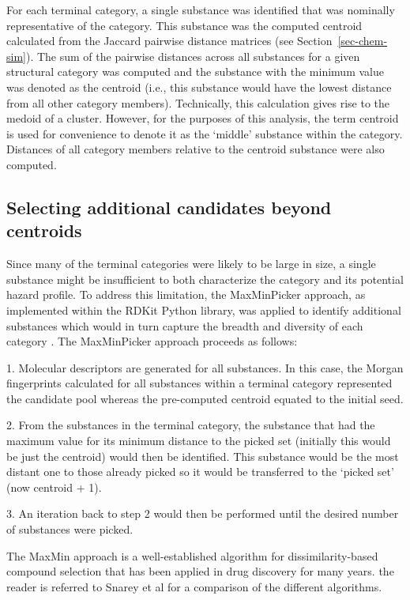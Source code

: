 \documentclass[
  super,
  preprint,
  3p]{elsarticle}
\begin{document}
For each terminal category, a single substance was identified that was
nominally representative of the category. This substance was the
computed centroid calculated from the Jaccard pairwise distance matrices
(see Section~\ref{sec-chem-sim}). The sum of the pairwise distances
across all substances for a given structural category was computed and
the substance with the minimum value was denoted as the centroid (i.e.,
this substance would have the lowest distance from all other category
members). Technically, this calculation gives rise to the medoid of a
cluster. However, for the purposes of this analysis, the term centroid
is used for convenience to denote it as the `middle' substance within
the category. Distances of all category members relative to the centroid
substance were also computed.

\hypertarget{sec-maxmin}{%
\subsection{Selecting additional candidates beyond
centroids}\label{sec-maxmin}}

Since many of the terminal categories were likely to be large in size, a
single substance might be insufficient to both characterize the category
and its potential hazard profile. To address this limitation, the
MaxMinPicker approach, as implemented within the RDKit Python library,
was applied to identify additional substances which would in turn
capture the breadth and diversity of each category
\citep{ashton_identification_2002}. The MaxMinPicker approach proceeds
as follows:

1. Molecular descriptors are generated for all substances. In this case,
the Morgan fingerprints calculated for all substances within a terminal
category represented the candidate pool whereas the pre-computed
centroid equated to the initial seed.

2. From the substances in the terminal category, the substance that had
the maximum value for its minimum distance to the picked set (initially
this would be just the centroid) would then be identified. This
substance would be the most distant one to those already picked so it
would be transferred to the `picked set' (now centroid + 1).

3. An iteration back to step 2 would then be performed until the desired
number of substances were picked.

The MaxMin approach is a well-established algorithm for
dissimilarity-based compound selection that has been applied in drug
discovery for many years. the reader is referred to Snarey et al
\citep{snarey_comparison_1997} for a comparison of the different
algorithms.
\end{document}
